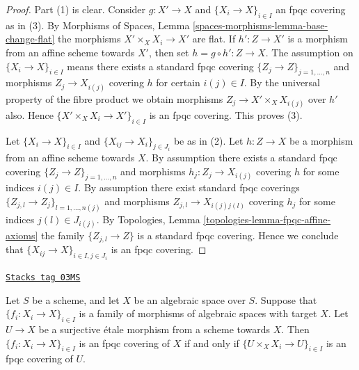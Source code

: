 \begin{proof}
Part (1) is clear. Consider $g : X' \to X$ and
$\{X_i \to X\}_{i\in I}$ an fpqc covering as in (3). By
Morphisms of Spaces, Lemma \ref{spaces-morphisms-lemma-base-change-flat}
the morphisms $X' \times_X X_i \to X'$
are flat. If $h' : Z \to X'$ is a morphism from an affine scheme
towards $X'$, then set $h = g \circ h' : Z \to X$. The assumption
on $\{X_i \to X\}_{i\in I}$ means there exists a standard fpqc covering
$\{Z_j \to Z\}_{j = 1, \ldots, n}$ and morphisms $Z_j \to X_{i(j)}$ covering
$h$ for certain $i(j) \in I$. By the universal property of the fibre product
we obtain morphisms $Z_j \to X' \times_X X_{i(j)}$ over $h'$ also.
Hence $\{X' \times_X X_i \to X'\}_{i\in I}$ is an fpqc covering.
This proves (3).

\medskip\noindent
Let $\{X_i \to X\}_{i\in I}$ and $\{X_{ij} \to X_i\}_{j\in J_i}$ be as
in (2). Let $h : Z \to X$ be a morphism from an affine scheme towards $X$.
By assumption there exists a standard fpqc covering
$\{Z_j \to Z\}_{j = 1, \ldots, n}$ and morphisms $h_j : Z_j \to X_{i(j)}$
covering $h$ for some indices $i(j) \in I$. By assumption there exist
standard fpqc coverings
$\{Z_{j, l} \to Z_j\}_{l = 1, \ldots, n(j)}$
and morphisms $Z_{j, l} \to X_{i(j)j(l)}$ covering
$h_j$ for some indices $j(l) \in J_{i(j)}$. By
Topologies, Lemma \ref{topologies-lemma-fpqc-affine-axioms}
the family $\{Z_{j, l} \to Z\}$ is a standard fpqc covering.
Hence we conclude that $\{X_{ij} \to X\}_{i \in I, j\in J_i}$
is an fpqc covering.
\end{proof}

\begin{lemma}
\label{spaces-topologies-lemma-recognize-fpqc-covering}
\href{https://stacks.math.columbia.edu/tag/03MS}{\texttt{Stacks tag 03MS}}

Let $S$ be a scheme, and let $X$ be an algebraic space over $S$.
Suppose that $\{f_i : X_i \to X\}_{i \in I}$ is a family of morphisms of
algebraic spaces with target $X$. Let $U \to X$ be a surjective
\'etale morphism from a scheme towards $X$. Then
$\{f_i : X_i \to X\}_{i \in I}$ is an fpqc covering of $X$ if and only
if $\{U \times_X X_i \to U\}_{i \in I}$ is an fpqc covering of $U$.
\end{lemma}


